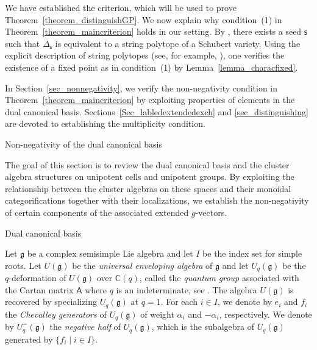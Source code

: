 \documentclass[11pt]{amsart}
\makeatletter
\def\section{\@startsection{section}{1}%
  \z@{-1.2\linespacing\@plus-.5\linespacing}{.8\linespacing}%
  {\normalfont\bfseries\large}}
\def\subsection{\@startsection{subsection}{2}%
  \z@{-.8\linespacing\@plus-.3\linespacing}{.3\linespacing\@plus.2\linespacing}%
  {\normalfont\bfseries}}
\newcommand{\C}{\mathbb{C}}
\def\frak{\mathfrak}
\numberwithin{equation}{section}
\theoremstyle{plain}
\theoremstyle{definition}
\numberwithin{equation}{section}
\newcommand{\seed}{\mathsf{s}}
\makeatother
\begin{document}
We have established the criterion, which will be used to prove Theorem~\ref{theorem_distinguishGP}. We now explain why condition~(1) in Theorem~\ref{theorem_maincriterion} holds in our setting. By \cite{FO17}, there exists a seed $\seed$ such that $\Delta_\seed$ is equivalent to a string polytope of a Schubert variety. Using the explicit description of string polytopes (see, for example, \cite{BZ01, Lit98}), one verifies the existence of a fixed point as in condition~(1) by Lemma~\ref{lemma_characfixed}.

In Section~\ref{sec_nonnegativity}, we verify the non-negativity condition in Theorem~\ref{theorem_maincriterion} by exploiting properties of elements in the dual canonical basis. Sections~\ref{Sec_labledextendedexch} and \ref{sec_distinguishing} are devoted to establishing the multiplicity condition.



\section{Non-negativity of the dual canonical basis}\label{sec_nonnegativity}

The goal of this section is to review the dual canonical basis and the cluster algebra structures on unipotent cells and unipotent groups. By exploiting the relationship between the cluster algebras on these spaces and their monoidal categorifications together with their localizations, we establish the non-negativity of certain components of the associated extended $g$-vectors.



\subsection{Dual canonical basis}

Let $\frak{g}$ be a complex semisimple Lie algebra and let $I$ be the index set for simple roots. Let $U(\mathfrak{g})$ be the \emph{universal enveloping algebra} of $\mathfrak{g}$ and  let $U_q(\mathfrak{g})$ be the $q$-deformation of $U(\mathfrak{g})$ over $\C(q)$, called the \emph{quantum group} associated with the Cartan matrix $\mathsf{A}$ where $q$ is an indeterminate, see \cite{LusztigBook}. The algebra $U(\mathfrak{g})$ is recovered by specializing $U_q(\mathfrak{g})$ at $q=1$. For each $i \in I$, we denote by $e_i$ and $f_i$ the \emph{Chevalley generators} of $U_q(\mathfrak{g})$ of weight $\alpha_i$ and $- \alpha_i$, respectively. We denote by $U_q^-(\mathfrak{g})$ the \emph{negative half} of $U_q(\mathfrak{g})$, which is the subalgebra of $U_q(\mathfrak{g})$ generated by $\{ f_i \mid i \in I\}$. 
\end{document}
